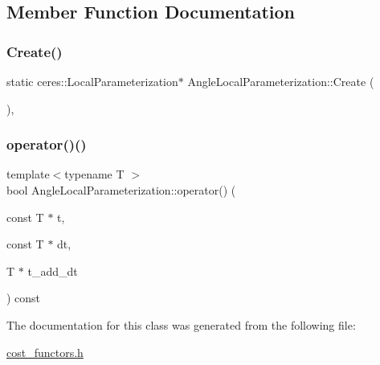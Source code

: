 \subsection{Member Function Documentation}
\mbox{\label{classAngleLocalParameterization_a73006f5f3280d4adccfa3612f8188868}} 
\subsubsection{\texorpdfstring{Create()}{Create()}}
{\footnotesize\ttfamily static ceres\+::\+Local\+Parameterization$\ast$ Angle\+Local\+Parameterization\+::\+Create (\begin{DoxyParamCaption}{ }\end{DoxyParamCaption})\hspace{0.3cm}{\ttfamily [inline]}, {\ttfamily [static]}}

\mbox{\label{classAngleLocalParameterization_a4395ea0db2ce1f4155d6a75931fcdff1}} 
\subsubsection{\texorpdfstring{operator()()}{operator()()}}
{\footnotesize\ttfamily template$<$typename T $>$ \\
bool Angle\+Local\+Parameterization\+::operator() (\begin{DoxyParamCaption}\item[{const T $\ast$}]{t,  }\item[{const T $\ast$}]{dt,  }\item[{T $\ast$}]{t\+\_\+add\+\_\+dt }\end{DoxyParamCaption}) const\hspace{0.3cm}{\ttfamily [inline]}}



The documentation for this class was generated from the following file\+:\begin{DoxyCompactItemize}
\item 
\hyperlink{cost__functors_8h}{cost\+\_\+functors.\+h}\end{DoxyCompactItemize}
